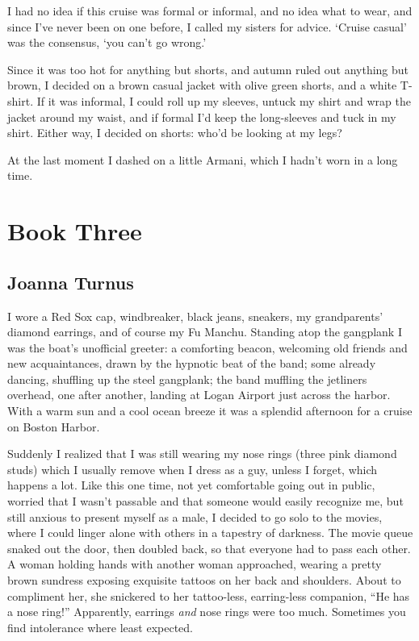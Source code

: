 I had no idea if this cruise was formal or informal, and no idea what to
wear, and since I've never been on one before, I called my sisters for
advice. `Cruise casual' was the consensus, `you can't go wrong.'

Since it was too hot for anything but shorts, and autumn ruled out
anything but brown, I decided on a brown casual jacket with olive green
shorts, and a white T-shirt. If it was informal, I could roll up my
sleeves, untuck my shirt and wrap the jacket around my waist, and if
formal I'd keep the long-sleeves and tuck in my shirt. Either way, I
decided on shorts: who'd be looking at my legs?

At the last moment I dashed on a little Armani, which I hadn't worn in a
long time.

\part{Book Three}\setcounter{chapter}{0}

\chapter{Joanna Turnus}

\titlemark

I wore a Red Sox cap, windbreaker, black jeans, sneakers, my
grandparents' diamond earrings, and of course my Fu Manchu. Standing
atop the gangplank I was the boat's unofficial greeter: a comforting
beacon, welcoming old friends and new acquaintances, drawn by the
hypnotic beat of the band; some already dancing, shuffling up the steel
gangplank; the band muffling the jetliners overhead, one after another,
landing at Logan Airport just across the harbor. With a warm sun and a
cool ocean breeze it was a splendid afternoon for a cruise on Boston
Harbor.

Suddenly I realized that I was still wearing my nose rings (three pink
diamond studs) which I usually remove when I dress as a guy, unless I
forget, which happens a lot. Like this one time, not yet comfortable
going out in public, worried that I wasn't passable and that someone
would easily recognize me, but still anxious to present myself as a
male, I decided to go solo to the movies, where I could linger alone
with others in a tapestry of darkness. The movie queue snaked out the
door, then doubled back, so that everyone had to pass each other. A
woman holding hands with another woman approached, wearing a pretty
brown sundress exposing exquisite tattoos on her back and shoulders.
About to compliment her, she snickered to her tattoo-less, earring-less
companion, ``He has a nose ring!'' Apparently, earrings \emph{and} nose
rings were too much. Sometimes you find intolerance where least
expected.

